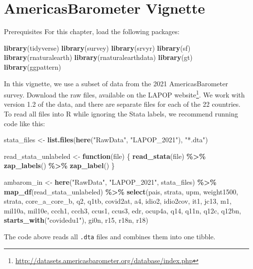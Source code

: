 \documentclass[
]{krantz}
\makeatletter
\newenvironment{Shaded}{\begin{snugshade}}{\end{snugshade}}
\newcommand{\ControlFlowTok}[1]{\textcolor[rgb]{0.27,0.27,0.27}{\textbf{#1}}}
\newcommand{\FunctionTok}[1]{\textcolor[rgb]{0.27,0.27,0.27}{\textbf{#1}}}
\newcommand{\NormalTok}[1]{#1}
\newcommand{\OtherTok}[1]{\textcolor[rgb]{0.37,0.37,0.37}{#1}}
\newcommand{\SpecialCharTok}[1]{\textcolor[rgb]{0.43,0.43,0.43}{\textbf{#1}}}
\newcommand{\StringTok}[1]{\textcolor[rgb]{0.5,0.5,0.5}{#1}}
\renewcommand{\href}[2]{#2\footnote{\url{#1}}}
\newenvironment{kframe}{%
\medskip{}
\setlength{\fboxsep}{.8em}
 \def\at@end@of@kframe{}%
 \ifinner\ifhmode%
  \def\at@end@of@kframe{\end{minipage}}%
  \begin{minipage}{\columnwidth}%
 \fi\fi%
 \def\FrameCommand##1{\hskip\@totalleftmargin \hskip-\fboxsep
 \colorbox{shadecolor}{##1}\hskip-\fboxsep
     \hskip-\linewidth \hskip-\@totalleftmargin \hskip\columnwidth}%
 \MakeFramed {\advance\hsize-\width
   \@totalleftmargin\z@ \linewidth\hsize
   \@setminipage}}%
 {\par\unskip\endMakeFramed%
 \at@end@of@kframe}
\renewenvironment{Shaded}{\begin{kframe}}{\end{kframe}}
\makeatother
\begin{document}
\hypertarget{c14-ambarom-vignette}{%
\chapter{AmericasBarometer Vignette}\label{c14-ambarom-vignette}}

\begin{prereqbox}{Prerequisites}
For this chapter, load the following packages:

\begin{Shaded}
\begin{Highlighting}[]
\FunctionTok{library}\NormalTok{(tidyverse)}
\FunctionTok{library}\NormalTok{(survey)}
\FunctionTok{library}\NormalTok{(srvyr)}
\FunctionTok{library}\NormalTok{(sf)}
\FunctionTok{library}\NormalTok{(rnaturalearth)}
\FunctionTok{library}\NormalTok{(rnaturalearthdata)}
\FunctionTok{library}\NormalTok{(gt)}
\FunctionTok{library}\NormalTok{(ggpattern)}
\end{Highlighting}
\end{Shaded}

In this vignette, we use a subset of data from the 2021 AmericasBarometer survey. Download the raw files, available on the \href{http://datasets.americasbarometer.org/database/index.php}{LAPOP website}. We work with version 1.2 of the data, and there are separate files for each of the 22 countries. To read all files into R while ignoring the Stata labels, we recommend running code like this:

\begin{Shaded}
\begin{Highlighting}[]
\NormalTok{stata\_files }\OtherTok{\textless{}{-}} \FunctionTok{list.files}\NormalTok{(}\FunctionTok{here}\NormalTok{(}\StringTok{"RawData"}\NormalTok{, }\StringTok{"LAPOP\_2021"}\NormalTok{), }\StringTok{"*.dta"}\NormalTok{)}

\NormalTok{read\_stata\_unlabeled }\OtherTok{\textless{}{-}} \ControlFlowTok{function}\NormalTok{(file) \{}
  \FunctionTok{read\_stata}\NormalTok{(file) }\SpecialCharTok{\%\textgreater{}\%}
    \FunctionTok{zap\_labels}\NormalTok{() }\SpecialCharTok{\%\textgreater{}\%}
    \FunctionTok{zap\_label}\NormalTok{()}
\NormalTok{\}}

\NormalTok{ambarom\_in }\OtherTok{\textless{}{-}} \FunctionTok{here}\NormalTok{(}\StringTok{"RawData"}\NormalTok{, }\StringTok{"LAPOP\_2021"}\NormalTok{, stata\_files) }\SpecialCharTok{\%\textgreater{}\%}
  \FunctionTok{map\_df}\NormalTok{(read\_stata\_unlabeled) }\SpecialCharTok{\%\textgreater{}\%}
  \FunctionTok{select}\NormalTok{(pais, strata, upm, weight1500, strata, core\_a\_core\_b,}
\NormalTok{         q2, q1tb, covid2at, a4, idio2, idio2cov, it1, jc13,}
\NormalTok{         m1, mil10a, mil10e, ccch1, ccch3, ccus1, ccus3,}
\NormalTok{         edr, ocup4a, q14, q11n, q12c, q12bn,}
         \FunctionTok{starts\_with}\NormalTok{(}\StringTok{"covidedu1"}\NormalTok{), gi0n,}
\NormalTok{         r15, r18n, r18) }
\end{Highlighting}
\end{Shaded}

The code above reads all \texttt{.dta} files and combines them into one tibble.

\end{prereqbox}
\end{document}
